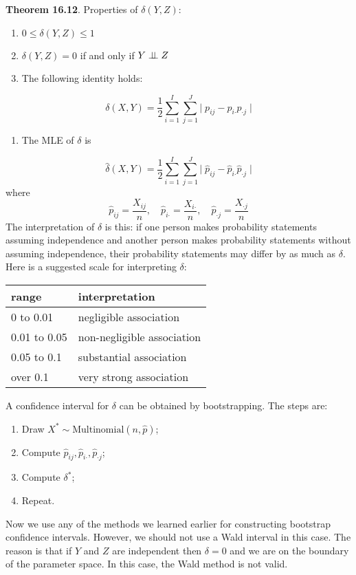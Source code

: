 \textbf{Theorem 16.12}. Properties of \(\delta(Y, Z)\):
\begin{enumerate}[tightlist,label={\arabic*.}]
\item
  \(0 \leq \delta(Y, Z) \leq 1\)
\item
  \(\delta(Y, Z) = 0\) if and only if \(Y \perp\!\!\!\perp Z\)
\item
  The following identity holds:
\end{enumerate}
\[
\delta(X, Y) = \frac{1}{2} \sum_{i=1}^I \sum_{j=1}^J \Big|\; p_{ij} - p_{i\text{·}} p_{\text{·}j} \;\Big|
\]
\begin{enumerate}[tightlist,label={\arabic*.},resume]
\item
  The MLE of \(\delta\) is
\end{enumerate}
\[
\hat{\delta}(X, Y) = \frac{1}{2} \sum_{i=1}^I \sum_{j=1}^J \Big|\; \hat{p}_{ij} - \hat{p}_{i\text{·}} \hat{p}_{\text{·}j} \;\Big|
\]
where
\[
\hat{p}_{ij} = \frac{X_{ij}}{n},
\quad \hat{p}_{i\text{·}} = \frac{X_{i\text{·}}}{n},
\quad \hat{p}_{\text{·}j} = \frac{X_{\text{·}j}}{n}
\]
The interpretation of \(\delta\) is this: if one person makes
probability statements assuming independence and another person makes
probability statements without assuming independence, their probability
statements may differ by as much as \(\delta\). Here is a suggested scale
for interpreting \(\delta\):
\begin{table}[H]
\centering
\begin{tabular}{@{}ll@{}}
\toprule
range & interpretation \\
\midrule
0 to 0.01 & negligible association \\
0.01 to 0.05 & non-negligible association \\
0.05 to 0.1 & substantial association \\
over 0.1 & very strong association \\
\bottomrule
\end{tabular}
\end{table}
A confidence interval for \(\delta\) can be obtained by bootstrapping.
The steps are:
\begin{enumerate}[tightlist,label={\arabic*.}]
\item
  Draw \(X^{*} \sim \text{Multinomial}(n, \hat{p})\);
\item
  Compute \(\hat{p}_{ij}, \hat{p}_{i\text{·}}, \hat{p}_{\text{·}j}\);
\item
  Compute \(\delta^{*}\);
\item
  Repeat.
\end{enumerate}
Now we use any of the methods we learned earlier for constructing
bootstrap confidence intervals. However, we should not use a Wald
interval in this case. The reason is that if \(Y\) and \(Z\) are
independent then \(\delta = 0\) and we are on the boundary of the
parameter space. In this case, the Wald method is not valid.

